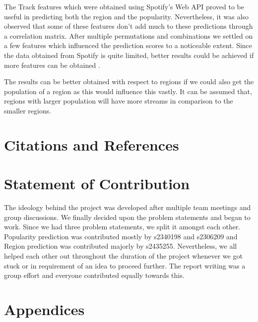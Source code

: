 \documentclass{article}
\begin{document}
The Track features which were obtained using Spotify's Web API proved to be useful in predicting both the region and the popularity. Nevertheless, it was also observed that some of these features don't add much to these predictions through a correlation matrix. After multiple permutations and combinations we settled on a few features which influenced the prediction scores to a noticeable extent. Since the data obtained from Spotify is quite limited, better results could be achieved if more features can be obtained \cite{inproceedings}.

The results can be better obtained with respect to regions if we could also get the population of a region as this would influence this vastly. It can be assumed that, regions with larger population will have more streams in comparison to the smaller regions. 





\section*{Citations and References}




\section*{Statement of Contribution}

The ideology behind the project was developed after multiple team meetings and group discussions. We finally decided upon the problem statements and began to work. Since we had three problem statements, we split it amongst each other. Popularity prediction was contributed mostly by s2340198 and s2306209 and Region prediction was contributed majorly by s2435255. Nevertheless, we all helped each other out throughout the duration of the project whenever we got stuck or in requirement of an idea to proceed further. The report writing was a group effort and everyone contributed equally towards this.  

\section*{Appendices}
\appendix
\end{document}
